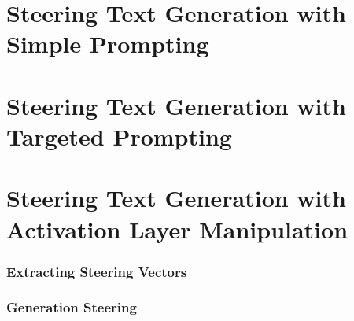 \section{Steering Text Generation with Simple Prompting}
\label{sec:approach:steering:simple}


\section{Steering Text Generation with Targeted Prompting}
\label{sec:approach:steering:targeted}


\section{Steering Text Generation with Activation Layer Manipulation}
\label{sec:approach:steering:actAdd}

\subsubsection{Extracting Steering Vectors}

\subsubsection{Generation Steering}